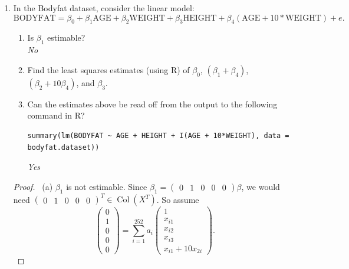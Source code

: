 \documentclass[12pt]{article}
\DeclareMathOperator*{\Col}{Col}
\begin{document}
\begin{enumerate}[leftmargin=0cm,itemindent=.5cm,labelwidth=\itemindent,labelsep=0cm,align=left]
\begin{proof}
\begin{align*}
\hat{\beta_0} + \hat{\beta_2} &= Y_2\\
\hat{\beta_1} - \hat{\beta_2} &= (\hat{\beta_0} + \hat{\beta_1}) - (\hat{\beta_0} + \hat{\beta_2}) = Y_1 - Y_2 \\
\hat{\beta_1} + \hat{\beta_2} + \hat{\beta_3} - 3\hat{\beta_4} &= (\hat{\beta_0} + \hat{\beta_1}) + (\hat{\beta_0} + \hat{\beta_2}) + (\hat{\beta_0} + \hat{\beta_3}) - 3(\hat{\beta_0} + \hat{\beta_3})
\\
&= Y_1 + Y_2 + Y_3 - 3Y_4
\end{align*}

\end{proof}

\item In the Bodyfat dataset, consider the linear model:
$$\text{BODYFAT} = \beta_0 + \beta_1 \text{AGE} + \beta_2 \text{WEIGHT} + \beta_3 \text{HEIGHT} + \beta_4 (\text{AGE} + 10*\text{WEIGHT}) + e.$$

\begin{enumerate}
\item Is $\beta_1$ estimable? \\ \emph{No}
\item Find the least squares estimates (using R) of $\beta_0$, $(\beta_1 + \beta_4)$, $(\beta_2 + 10\beta_4)$, and $\beta_3$.
\item Can the estimates above be read off from the output to the following command in R?
\begin{lstlisting}
summary(lm(BODYFAT ~ AGE + HEIGHT + I(AGE + 10*WEIGHT), data = bodyfat.dataset))
\end{lstlisting} \emph{Yes}
\end{enumerate}

\begin{proof}
\ (a) $\beta_1$ is not estimable.  Since $\beta_1 = (\begin{matrix} 0 & 1 & 0 & 0 & 0 \end{matrix}) \beta$, we would need $(\begin{matrix}0 & 1 & 0 & 0 & 0 \end{matrix})^T \in \Col(X^T)$.  So assume
$$
\left(
\begin{matrix}
0 \\ 1 \\ 0 \\ 0 \\ 0
\end{matrix}
\right)
=
\sum\limits_{i=1}^{252} a_i
\left(
\begin{matrix}
1 \\
x_{i1} \\
x_{i2} \\
x_{i3} \\
x_{i1} + 10x_{2i}
\end{matrix}
\right).
$$


\end{proof}
\end{enumerate}
\end{document}
